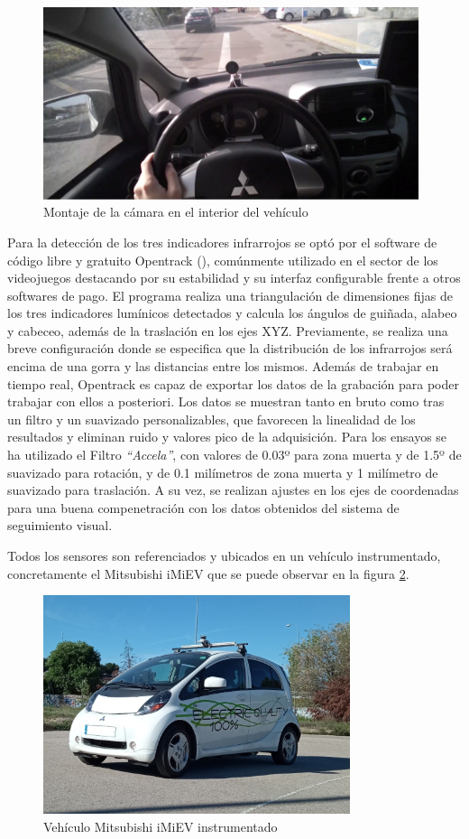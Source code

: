 \begin{figure}[hb]
    \centering
    \includegraphics[width=11cm]
    {figures/4.8.png}
    \caption{ \label{fig:4.8} Montaje de la cámara en el interior del vehículo}
\end{figure}

Para la detección de los tres indicadores infrarrojos se optó por el software de código libre y gratuito Opentrack (\cite{opentrack}), comúnmente utilizado en el sector de los videojuegos destacando por su estabilidad y su interfaz configurable frente a otros softwares de pago. El programa realiza una triangulación de dimensiones fijas de los tres indicadores lumínicos detectados y calcula los ángulos de guiñada, alabeo y cabeceo, además de la traslación en los ejes XYZ. Previamente, se realiza una breve configuración donde se especifica que la distribución de los infrarrojos será encima de una gorra y las distancias entre los mismos. Además de trabajar en tiempo real, Opentrack es capaz de exportar los datos de la grabación para poder trabajar con ellos a posteriori. Los datos se muestran tanto en bruto como tras un filtro y un suavizado personalizables, que favorecen la linealidad de los resultados y eliminan ruido y valores pico de la adquisición. Para los ensayos se ha utilizado el Filtro \emph{“Accela”}, con valores de 0.03º para zona muerta y de 1.5º de suavizado para rotación, y de 0.1 milímetros de zona muerta y 1 milímetro de suavizado para traslación. A su vez, se realizan ajustes en los ejes de coordenadas para una buena compenetración con los datos obtenidos del sistema de seguimiento visual. 

Todos los sensores son referenciados y ubicados en un vehículo instrumentado, concretamente el Mitsubishi iMiEV que se puede observar en la figura \ref{fig:4.9}.

\begin{figure}[h]
    \centering
    \includegraphics[width=9cm]
    {figures/4.9.png}
    \caption{ \label{fig:4.9} Vehículo Mitsubishi iMiEV instrumentado}
\end{figure}

